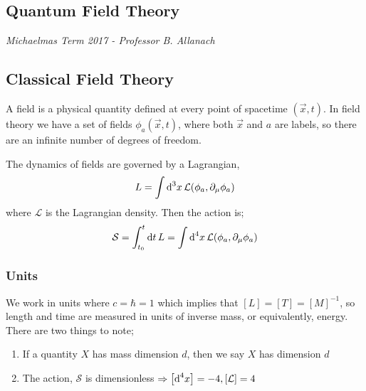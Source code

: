\label{qft}
\begin{chapterbox}
\vspace{-60pt}
\chapter{Quantum Field Theory}
\vspace{-30pt}
\centering\normalsize\textit{Michaelmas Term 2017 - Professor B. Allanach}
\end{chapterbox}
\vspace{20pt}
\minitoc
\newpage
\section{Classical Field Theory}
\begin{definitionbox}
A field is a physical quantity defined at every point of spacetime $(\vec x, t)$. In field theory we have a set of fields $\phi_a (\vec x, t)$, where both $\vec x$ and $a$ are labels, so there are an infinite number of degrees of freedom.
\end{definitionbox}
The dynamics of fields are governed by a Lagrangian,
\begin{equation}
L = \int{\text{d}^3 x \, \mathcal{L}(\phi_a, \partial_\mu \phi_a)}
\end{equation}
where $\mathcal{L}$ is the Lagrangian density. Then the action is;
\begin{equation}
\mathcal{S} = \int_{t_0}^{t}{\text{d}t \, L} = \int{\text{d}^4 x \, \mathcal{L}(\phi_a, \partial_\mu \phi_a)}
\end{equation}
\subsection{Units}
We work in units where $c = \hbar = 1$ which implies that $\left[L\right] = \left[T\right] = \left[M\right]^{-1}$, so length and time are measured in units of inverse mass, or equivalently, energy. There are two things to note;
\begin{enumerate}
\item If a quantity $X$ has mass dimension $d$, then we say $X$ has dimension $d$
\item The action, $\mathcal{S}$ is dimensionless $\Rightarrow \left[\ud^4 x\right] = -4, \left[\mathcal{L}\right] = 4$
\end{enumerate}
